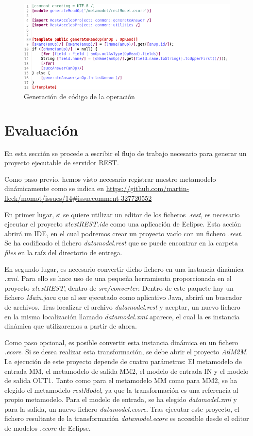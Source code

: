 \documentclass[runningheads]{llncs}
\begin{document}
\begin{figure}
    \centering
    \includegraphics[width=\textwidth]{generateReadOp}
    \caption{Generación de código de la operación \READ}
    \label{fig:gen-read}
\end{figure}

\section{Evaluación}
\label{sc:eval}

En esta sección se procede a escribir el flujo de trabajo necesario para generar un proyecto ejecutable de servidor REST.

Como paso previo, hemos visto necesario registrar nuestro metamodelo dinámicamente como se indica en \url{https://github.com/martin-fleck/momot/issues/14\#issuecomment-327720552} 

En primer lugar, si se quiere utilizar un editor de los ficheros \textit{.rest}, es necesario ejecutar el proyecto \textit{xtextREST.ide} como una aplicación de Eclipse. Esta acción abrirá un IDE, en el cual podremos crear un proyecto vacío con un fichero \textit{.rest}. Se ha codificado el fichero \textit{datamodel.rest} que se puede encontrar en la carpeta \textit{files} en la raíz del directorio de entrega.

En segundo lugar, es necesario convertir dicho fichero en una instancia dinámica \textit{.xmi}. Para ello se hace uso de una pequeña herramienta proporcionada en el proyecto \textit{xtextREST}, dentro de \textit{src/converter}. Dentro de este paquete hay un fichero \textit{Main.java} que al ser ejecutado como aplicativo Java, abrirá un buscador de archivos. Tras localizar el archivo \textit{datamodel.rest} y aceptar, un nuevo fichero en la misma localización llamado \textit{datamodel.xmi} aparece, el cual la es instancia dinámica que utilizaremos a partir de ahora.

Como paso opcional, es posible convertir esta instancia dinámica en un fichero \textit{.ecore}. Si se desea realizar esta transformación, se debe abrir el proyecto \textit{AtlM2M}. La ejecución de este proyecto depende de cuatro parámetros: El metamodelo de entrada MM, el metamodelo de salida MM2, el modelo de entrada IN y el modelo de salida OUT1. Tanto como para el metamodelo MM como para MM2, se ha elegido el metamodelo \textit{restModel}, ya que la transformación es una referencia al propio metamodelo. Para el modelo de entrada, se ha elegido \textit{datamodel.xmi} y para la salida, un nuevo fichero \textit{datamodel.ecore}. Tras ejecutar este proyecto, el fichero resultante de la transformación \textit{datamodel.ecore} es accesible desde el editor de modelos \textit{.ecore} de Eclipse.
\end{document}
